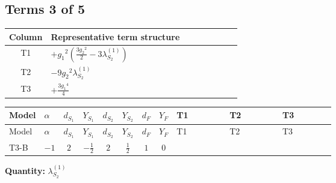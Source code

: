 \documentclass[8pt]{article}
\begin{document}
\begin{landscape}
\subsection*{Terms 3 of 5}
\begin{center}
\begin{tabular}{@{}c >{\raggedright\arraybackslash}p{0.82\linewidth}@{}}
\toprule
Column & Representative term structure \\
\midrule
T1 & \(\displaystyle +{g_1}^2 \left(\frac{3 {g_2}^2}{2}-3 {\lambda_{S_2}^{(1)}}\right)\) \\
\midrule
T2 & \(\displaystyle -9 {g_2}^2 {\lambda_{S_2}^{(1)}}\) \\
\midrule
T3 & \(\displaystyle +\frac{3 {g_1}^4}{4}\) \\
\midrule
\bottomrule
\end{tabular}
\end{center}
\smallskip
\tiny
\begin{longtable}{@{}llcccccc >{\raggedright\arraybackslash}p{0.21\linewidth} >{\raggedright\arraybackslash}p{0.21\linewidth} >{\raggedright\arraybackslash}p{0.21\linewidth}@{}}
\toprule
Model & $\alpha$ & $d_{S_1}$ & $Y_{S_1}$ & $d_{S_2}$ & $Y_{S_2}$ & $d_F$ & $Y_F$ & T1 & T2 & T3 \\
\midrule
\endfirsthead
\toprule
Model & $\alpha$ & $d_{S_1}$ & $Y_{S_1}$ & $d_{S_2}$ & $Y_{S_2}$ & $d_F$ & $Y_F$ & T1 & T2 & T3 \\
\midrule
\endhead
T3-B & $-1$ & $2$ & $-\frac{1}{2}$ & $2$ & $\frac{1}{2}$ & $1$ & $0$ & \scriptsize\adjustbox{max width=\linewidth}{$\begin{gathered} +{g_1}^2 \left(\frac{3 {g_2}^2}{2}-3 {\lambda_{S_2}^{(1)}}\right)\end{gathered}$} & \scriptsize\adjustbox{max width=\linewidth}{$\begin{gathered} -9 {g_2}^2 {\lambda_{S_2}^{(1)}}\end{gathered}$} & \scriptsize\adjustbox{max width=\linewidth}{$\begin{gathered} +\frac{3 {g_1}^4}{4}\end{gathered}$} \\
\midrule
\bottomrule
\end{longtable}
\clearpage
\noindent\textbf{Quantity: }$\lambda_{S_2}^{(1)}$\par\smallskip

\end{landscape}
\end{document}
